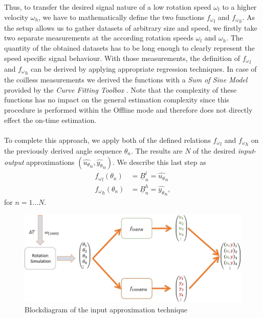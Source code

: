 \documentclass[english]{isasthesis}
\begin{document}
    		Thus, to transfer the desired signal nature of a low rotation speed $\omega_l$ to a higher velocity $\omega_h$, we have to mathematically define the two functions ${f_\omega}_l$ and ${f_\omega}_h$. As the setup allows us to gather datasets of arbitrary size and speed, we firstly take two separate measurements at the according rotation speeds $\omega_l$ and $\omega_h$. The quantity of the obtained datasets has to be long enough to clearly represent the speed specific signal behaviour. With those measurements, the definition of ${f_\omega}_l$ and ${f_\omega}_h$ can be derived by applying appropriate regression techniques. In case of the coilless measurements we derived the functions with a \textit{Sum of Sine Model} provided by the \textit{Curve Fitting Toolbox} \cite{matlabcurve}. Note that the complexity of these functions has no impact on the general estimation complexity since this procedure is performed within the Offline mode and therefore does not directly effect the on-time estimation. \\ \\
    		To complete this approach, we apply both of the defined relations ${f_\omega}_l$ and ${f_\omega}_h$ on the previously derived angle sequence $\theta_n$. The results are $N$ of the desired \textit{input}-\textit{output} approximations $(\hat{{u_\theta}}_n,\hat{{y_\theta}}_n)$. We describe this last step as 
    		\begin{equation}
    		\begin{aligned}
			{f_\omega}_l(\theta_n) &=  \underline{B}_n^l = \hat{{u_\theta}}_n		 \\
			{f_\omega}_h(\theta_n) &=  \underline{B}_n^h = \hat{{y_\theta}}_n,
			\end{aligned}
    		\end{equation}
    		for $n = 1\dots N$.
    		\begin{figure}[t]
    		\begin{center}
    			\includegraphics[width=1\textwidth]{figures/block_diagram_sampling.jpg}   
  			\end{center}
    		\caption{Blockdiagram of the input approximation technique}
    		\label{fig:input estimation}
    		\end{figure}
\end{document}
